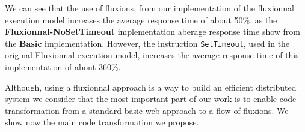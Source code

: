 We can see that the use of fluxions, from our implementation of the fluxionnal execution model increases the average response time of about 50\%, as the \textbf{Fluxionnal-NoSetTimeout} implementation aberage response time show from the \textbf{Basic} implementation.
However, the instruction \texttt{SetTimeout}, used in the original Fluxionnal execution model, increases the average response time of this implementation of about 360\%.



\TODO{}
Although, using a fluxionnal approach is a way to build an efficient distributed system we consider that the most important part of our work is to enable code transformation from a standard basic web approach to a flow of fluxions.
We show now the main code transformation we propose.